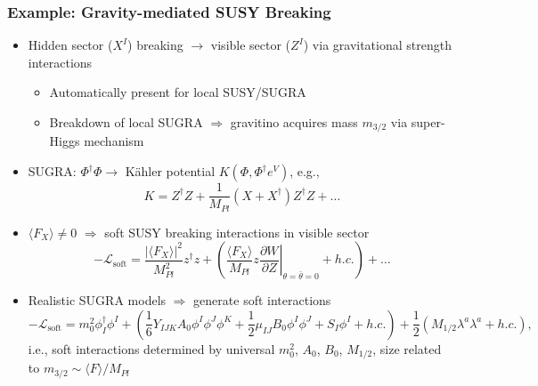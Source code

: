 \documentclass[10pt,aspectratio=169]{beamer}
\begin{document}
\begin{frame}
  \frametitle{Example: Gravity-mediated SUSY Breaking}
  \begin{itemize}\itemsep1em
  \item Hidden sector ($X^I$) breaking $\to$ visible sector ($Z^I$) via
    gravitational strength interactions
    \begin{itemize}\itemsep0.5em
    \item Automatically present for local SUSY/SUGRA
    \item Breakdown of local SUGRA $\Rightarrow$ gravitino
      acquires mass $m_{3/2}$ via super-Higgs mechanism
    \end{itemize}
  \item SUGRA: $\Phi^\dagger \Phi \to$ K\"{a}hler potential
    $K(\Phi, \Phi^\dagger e^V)$, e.g.,
    \begin{equation*}
      K = Z^\dagger Z + \frac{1}{M_{Pl}} ( X + X^\dagger) Z^\dagger Z
      + \ldots
    \end{equation*}
  \item $\langle F_X \rangle \neq 0$ $\Rightarrow$ soft SUSY breaking
    interactions in visible sector
    \begin{equation*}
      -\mathcal{L}_{\text{soft}} = \frac{|\langle F_X \rangle|^2}{M_{Pl}^2}
      z^\dagger z + \left ( \frac{\langle F_X \rangle}{M_{Pl}} z \left .
      \frac{\partial W} {\partial Z} \right |_{\theta = \bar{\theta} = 0}
      + h.c. \right ) + \ldots
    \end{equation*}
  \item Realistic SUGRA models $\Rightarrow$ generate soft interactions
    \begin{equation*}
      -\mathcal{L}_{\text{soft}} = m_0^2 \phi^\dagger_I \phi^I + \left (
      \frac{1}{6} Y_{IJK} A_0 \phi^I \phi^J \phi^K + \frac{1}{2} \mu_{IJ}
      B_0 \phi^I \phi^J + S_I \phi^I + h.c. \right )
      + \frac{1}{2} \left ( M_{1/2} \lambda^a \lambda^a + h.c. \right ) ,
    \end{equation*}
    i.e., {\color{blue} soft interactions determined by universal $m_0^2$,
      $A_0$, $B_0$, $M_{1/2}$}, size related to $m_{3/2} \sim \langle F
    \rangle / M_{Pl}$
  \end{itemize}
\end{frame}
\end{document}
